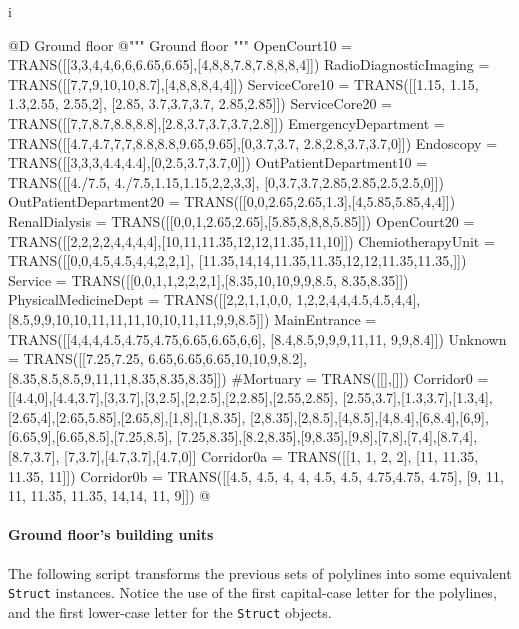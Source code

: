 i\documentclass[11pt,oneside]{article}    %
\begin{document}
@D Ground floor 
@{""" Ground floor """
OpenCourt10 = TRANS([[3,3,4,4,6,6,6.65,6.65],[4,8,8,7.8,7.8,8,8,4]])
RadioDiagnosticImaging = TRANS([[7,7,9,10,10,8.7],[4,8,8,8,4,4]])
ServiceCore10 = TRANS([[1.15, 1.15, 1.3,2.55, 2.55,2], [2.85, 3.7,3.7,3.7, 
    2.85,2.85]])
ServiceCore20 = TRANS([[7,7,8.7,8.8,8.8],[2.8,3.7,3.7,3.7,2.8]])
EmergencyDepartment = TRANS([[4.7,4.7,7,7,8.8,8.8,9.65,9.65],[0,3.7,3.7,
    2.8,2.8,3.7,3.7,0]])
Endoscopy = TRANS([[3,3,3,4.4,4.4],[0,2.5,3.7,3.7,0]])
OutPatientDepartment10 = TRANS([[4./7.5, 4./7.5,1.15,1.15,2,2,3,3],
    [0,3.7,3.7,2.85,2.85,2.5,2.5,0]])
OutPatientDepartment20 = TRANS([[0,0,2.65,2.65,1.3],[4,5.85,5.85,4,4]])
RenalDialysis = TRANS([[0,0,1,2.65,2.65],[5.85,8,8,8,5.85]])
OpenCourt20 = TRANS([[2,2,2,2,4,4,4,4],[10,11,11.35,12,12,11.35,11,10]])
ChemiotherapyUnit = TRANS([[0,0,4.5,4.5,4,4,2,2,1],
    [11.35,14,14,11.35,11.35,12,12,11.35,11.35,]])
Service = TRANS([[0,0,1,1,2,2,2,1],[8.35,10,10,9,9,8.5, 8.35,8.35]])
PhysicalMedicineDept = TRANS([[2,2,1,1,0,0, 1,2,2,4,4,4.5,4.5,4,4],
    [8.5,9,9,10,10,11,11,11,10,10,11,11,9,9,8.5]])
MainEntrance = TRANS([[4,4,4,4.5,4.75,4.75,6.65,6.65,6,6],
    [8.4,8.5,9,9,9,11,11, 9,9,8.4]])
Unknown = TRANS([[7.25,7.25, 6.65,6.65,6.65,10,10,9,8.2],
    [8.35,8.5,8.5,9,11,11,8.35,8.35,8.35]])
#Mortuary = TRANS([[],[]])
Corridor0 = [[4.4,0],[4.4,3.7],[3,3.7],[3,2.5],[2,2.5],[2,2.85],[2.55,2.85],
    [2.55,3.7],[1.3,3.7],[1.3,4],[2.65,4],[2.65,5.85],[2.65,8],[1,8],[1,8.35],
    [2,8.35],[2,8.5],[4,8.5],[4,8.4],[6,8.4],[6,9],[6.65,9],[6.65,8.5],[7.25,8.5],
    [7.25,8.35],[8.2,8.35],[9,8.35],[9,8],[7,8],[7,4],[8.7,4],[8.7,3.7],
    [7,3.7],[4.7,3.7],[4.7,0]]
Corridor0a = TRANS([[1, 1, 2, 2], [11, 11.35, 11.35, 11]])
Corridor0b = TRANS([[4.5, 4.5, 4, 4, 4.5, 4.5, 4.75,4.75, 4.75],
    [9, 11, 11, 11.35, 11.35, 14,14, 11, 9]])
@}



\paragraph{Ground floor's building units}

The following script transforms the previous sets of polylines into some equivalent \texttt{Struct} instances.
Notice the use of the first capital-case letter for the polylines, and the first lower-case letter for the \texttt{Struct} objects.
\end{document}
